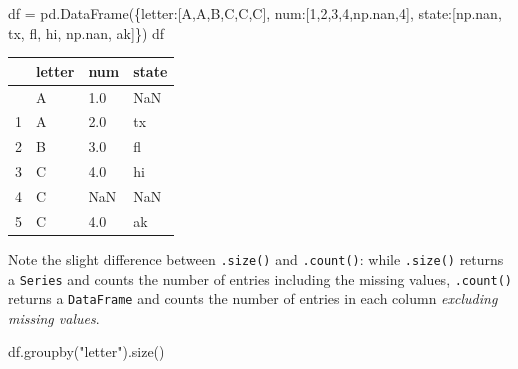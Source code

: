 \documentclass[
  letterpaper,
  DIV=11,
  numbers=noendperiod]{scrreprt}
\newenvironment{Shaded}{\begin{snugshade}}{\end{snugshade}}
\newcommand{\DecValTok}[1]{\textcolor[rgb]{0.68,0.00,0.00}{#1}}
\newcommand{\NormalTok}[1]{\textcolor[rgb]{0.00,0.23,0.31}{#1}}
\newcommand{\OperatorTok}[1]{\textcolor[rgb]{0.37,0.37,0.37}{#1}}
\newcommand{\StringTok}[1]{\textcolor[rgb]{0.13,0.47,0.30}{#1}}
\begin{document}
\begin{Shaded}
\begin{Highlighting}[]
\NormalTok{df }\OperatorTok{=}\NormalTok{ pd.DataFrame(\{}\StringTok{\textquotesingle{}letter\textquotesingle{}}\NormalTok{:[}\StringTok{\textquotesingle{}A\textquotesingle{}}\NormalTok{,}\StringTok{\textquotesingle{}A\textquotesingle{}}\NormalTok{,}\StringTok{\textquotesingle{}B\textquotesingle{}}\NormalTok{,}\StringTok{\textquotesingle{}C\textquotesingle{}}\NormalTok{,}\StringTok{\textquotesingle{}C\textquotesingle{}}\NormalTok{,}\StringTok{\textquotesingle{}C\textquotesingle{}}\NormalTok{], }
                   \StringTok{\textquotesingle{}num\textquotesingle{}}\NormalTok{:[}\DecValTok{1}\NormalTok{,}\DecValTok{2}\NormalTok{,}\DecValTok{3}\NormalTok{,}\DecValTok{4}\NormalTok{,np.nan,}\DecValTok{4}\NormalTok{], }
                   \StringTok{\textquotesingle{}state\textquotesingle{}}\NormalTok{:[np.nan, }\StringTok{\textquotesingle{}tx\textquotesingle{}}\NormalTok{, }\StringTok{\textquotesingle{}fl\textquotesingle{}}\NormalTok{, }\StringTok{\textquotesingle{}hi\textquotesingle{}}\NormalTok{, np.nan, }\StringTok{\textquotesingle{}ak\textquotesingle{}}\NormalTok{]\})}
\NormalTok{df}
\end{Highlighting}
\end{Shaded}

\begin{longtable}[]{@{}llll@{}}
\toprule\noalign{}
& letter & num & state \\
\midrule\noalign{}
\endhead
\bottomrule\noalign{}
\endlastfoot
0 & A & 1.0 & NaN \\
1 & A & 2.0 & tx \\
2 & B & 3.0 & fl \\
3 & C & 4.0 & hi \\
4 & C & NaN & NaN \\
5 & C & 4.0 & ak \\
\end{longtable}

Note the slight difference between \texttt{.size()} and
\texttt{.count()}: while \texttt{.size()} returns a \texttt{Series} and
counts the number of entries including the missing values,
\texttt{.count()} returns a \texttt{DataFrame} and counts the number of
entries in each column \emph{excluding missing values}.

\begin{Shaded}
\begin{Highlighting}[]
\NormalTok{df.groupby(}\StringTok{"letter"}\NormalTok{).size()}
\end{Highlighting}
\end{Shaded}
\end{document}
